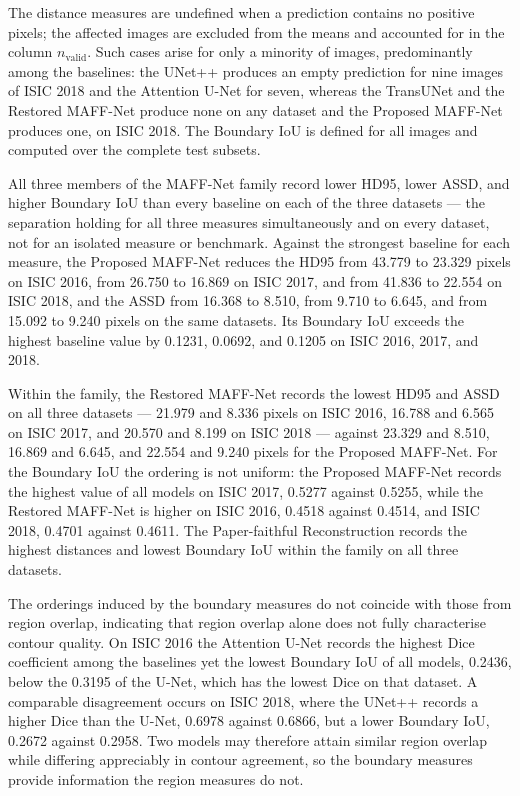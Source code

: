The distance measures are undefined when a prediction contains no positive pixels; the affected images are excluded from the means and accounted for in the column $n_{\mathrm{valid}}$. Such cases arise for only a minority of images, predominantly among the baselines: the UNet++ produces an empty prediction for nine images of ISIC 2018 and the Attention U-Net for seven, whereas the TransUNet and the Restored MAFF-Net produce none on any dataset and the Proposed MAFF-Net produces one, on ISIC 2018. The Boundary IoU is defined for all images and computed over the complete test subsets.

All three members of the MAFF-Net family record lower HD95, lower ASSD, and higher Boundary IoU than every baseline on each of the three datasets --- the separation holding for all three measures simultaneously and on every dataset, not for an isolated measure or benchmark. Against the strongest baseline for each measure, the Proposed MAFF-Net reduces the HD95 from 43.779 to 23.329 pixels on ISIC 2016, from 26.750 to 16.869 on ISIC 2017, and from 41.836 to 22.554 on ISIC 2018, and the ASSD from 16.368 to 8.510, from 9.710 to 6.645, and from 15.092 to 9.240 pixels on the same datasets. Its Boundary IoU exceeds the highest baseline value by 0.1231, 0.0692, and 0.1205 on ISIC 2016, 2017, and 2018.

Within the family, the Restored MAFF-Net records the lowest HD95 and ASSD on all three datasets --- 21.979 and 8.336 pixels on ISIC 2016, 16.788 and 6.565 on ISIC 2017, and 20.570 and 8.199 on ISIC 2018 --- against 23.329 and 8.510, 16.869 and 6.645, and 22.554 and 9.240 pixels for the Proposed MAFF-Net. For the Boundary IoU the ordering is not uniform: the Proposed MAFF-Net records the highest value of all models on ISIC 2017, 0.5277 against 0.5255, while the Restored MAFF-Net is higher on ISIC 2016, 0.4518 against 0.4514, and ISIC 2018, 0.4701 against 0.4611. The Paper-faithful Reconstruction records the highest distances and lowest Boundary IoU within the family on all three datasets.

The orderings induced by the boundary measures do not coincide with those from region overlap, indicating that region overlap alone does not fully characterise contour quality. On ISIC 2016 the Attention U-Net records the highest Dice coefficient among the baselines yet the lowest Boundary IoU of all models, 0.2436, below the 0.3195 of the U-Net, which has the lowest Dice on that dataset. A comparable disagreement occurs on ISIC 2018, where the UNet++ records a higher Dice than the U-Net, 0.6978 against 0.6866, but a lower Boundary IoU, 0.2672 against 0.2958. Two models may therefore attain similar region overlap while differing appreciably in contour agreement, so the boundary measures provide information the region measures do not.

